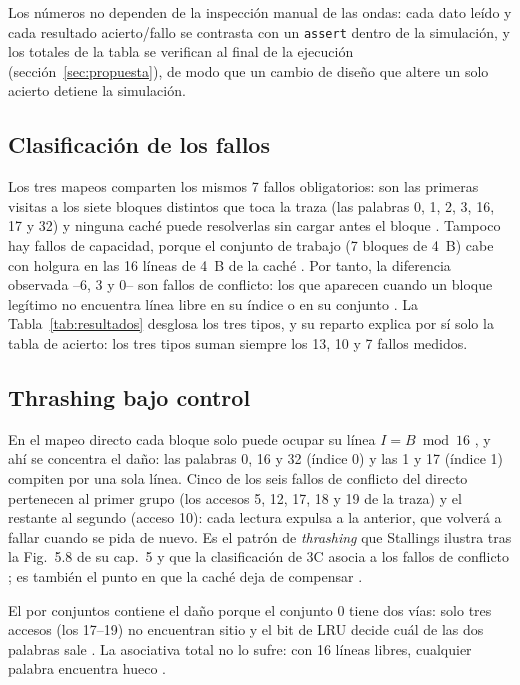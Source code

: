 \documentclass[llncs]{llncs}
\begin{document}
Los números no dependen de la inspección manual de las ondas: cada dato
leído y cada resultado acierto/fallo se contrasta con un \texttt{assert}
dentro de la simulación, y los totales de la tabla se verifican al
final de la ejecución (sección~\ref{sec:propuesta}), de modo que un
cambio de diseño que altere un solo acierto detiene la simulación.

\subsection{Clasificación de los fallos}
\label{sub:3c}

Los tres mapeos comparten los mismos 7 fallos obligatorios: son las
primeras visitas a los siete bloques distintos que toca la traza (las
palabras 0, 1, 2, 3, 16, 17 y 32) y ninguna caché puede resolverlas sin
cargar antes el bloque \cite{wikipedia-metrics,wikipedia-cache}. Tampoco
hay fallos de capacidad, porque el conjunto de trabajo (7 bloques de
4~B) cabe con holgura en las 16 líneas de 4~B de la caché
\cite{wikipedia-metrics}. Por tanto, la diferencia observada
--6, 3 y 0-- son fallos de conflicto: los que aparecen cuando un bloque
legítimo no encuentra línea libre en su índice o en su conjunto
\cite{wikipedia-metrics,stallings2019}. La Tabla~\ref{tab:resultados}
desglosa los tres tipos, y su reparto explica por sí solo la tabla de
acierto: los tres tipos suman siempre los 13, 10 y 7 fallos medidos.

\subsection{Thrashing bajo control}

En el mapeo directo cada bloque solo puede ocupar su línea
$I = B \bmod 16$ \cite{stallings2019,wikipedia-cpu-cache}, y ahí se
concentra el daño: las palabras 0, 16 y 32 (índice 0) y las 1 y 17
(índice 1) compiten por una sola línea. Cinco de los seis fallos de
conflicto del directo pertenecen al primer grupo (los accesos 5, 12,
17, 18 y 19 de la traza) y el restante al segundo (acceso 10): cada
lectura expulsa a la anterior, que volverá a fallar cuando se pida de
nuevo. Es el patrón de \emph{thrashing} que Stallings ilustra tras la
Fig.~5.8 de su cap.~5 \cite{stallings2019} y que la clasificación de 3C
asocia a los fallos de conflicto \cite{wikipedia-metrics}; es también el
punto en que la caché deja de compensar \cite{null2024}.

El por conjuntos contiene el daño porque el conjunto 0 tiene dos vías:
solo tres accesos (los 17--19) no encuentran sitio y el bit de LRU
decide cuál de las dos palabras sale \cite{wikipedia-cpu-cache,hennessy2019}.
La asociativa total no lo sufre: con 16 líneas libres, cualquier palabra
encuentra hueco \cite{stallings2019}.
\end{document}
